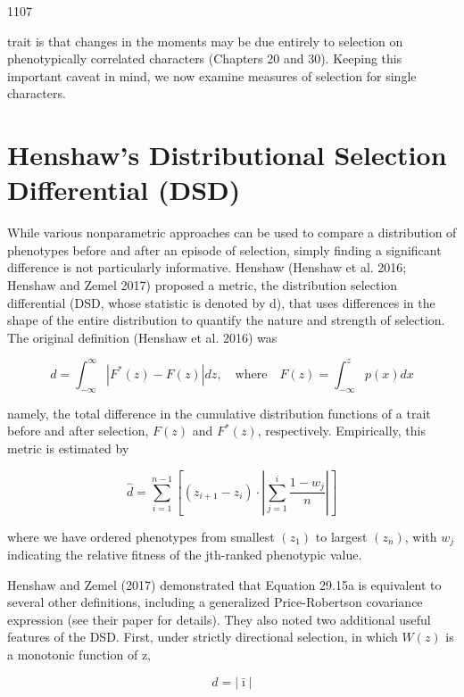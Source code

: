\documentclass{article}
\begin{document}
1107

trait is that changes in the moments may be due entirely to selection on phenotypically correlated characters (Chapters 20 and 30). Keeping this important caveat in mind, we now examine measures of selection for single characters.

\section{Henshaw's Distributional Selection Differential (DSD)}
While various nonparametric approaches can be used to compare a distribution of phenotypes before and after an episode of selection, simply finding a significant difference is not particularly informative. Henshaw (Henshaw et al. 2016; Henshaw and Zemel 2017) proposed a metric, the distribution selection differential (DSD, whose statistic is denoted by d), that uses differences in the shape of the entire distribution to quantify the nature and strength of selection. The original definition (Henshaw et al. 2016) was

\begin{equation}
d=\int_{-\infty}^{\infty}\left|F^{*}(z)-F(z)\right|dz,\quad\mathrm{w h e r e}\quad F(z)=\int_{-\infty}^{z}p(x)dx
\tag{29.15a}
\label{eq:29_15a}
\end{equation}

namely, the total difference in the cumulative distribution functions of a trait before and after selection,  $ F(z) $ and  $ F^{*}(z) $, respectively. Empirically, this metric is estimated by

\begin{equation}
\widehat{d}=\sum_{i=1}^{n-1}\left[\left(z_{i+1}-z_{i}\right)\cdot\left|\sum_{j=1}^{i}\frac{1-w_{j}}{n}\right|\right]
\tag{29.15b}
\label{eq:29_15b}
\end{equation}

where we have ordered phenotypes from smallest  $ (z_{1}) $ to largest  $ (z_{n}) $, with  $ w_{j} $ indicating the relative fitness of the jth-ranked phenotypic value.

Henshaw and Zemel (2017) demonstrated that Equation 29.15a is equivalent to several other definitions, including a generalized Price-Robertson covariance expression (see their paper for details). They also noted two additional useful features of the DSD. First, under strictly directional selection, in which  $ W(z) $ is a monotonic function of z,

\begin{equation}
d=\left|\bar{\imath}\right|
\tag{29.15c}
\label{eq:29_15c}
\end{equation}
\end{document}
